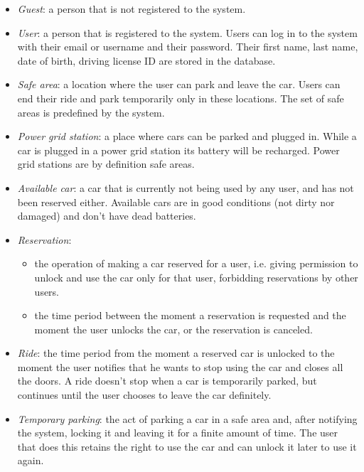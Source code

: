 \documentclass[english]{article}
\begin{document}
\begin{itemize}
\item{\textit{Guest}: a person that is not registered to the system.}
\item{\textit{User}: a person that is registered to the system. Users can log in to the system with their email or username and their password. Their first name, last name, date of birth, driving license ID are stored in the database.}
\item{\textit{Safe area}: a location where the user can park and leave the car. Users can end their ride and park temporarily only in these locations. The set of safe areas is predefined by the system.}
\item{\textit{Power grid station}: a place where cars can be parked and plugged in. While a car is plugged in a power grid station its battery will be recharged. Power grid stations are by definition safe areas.}
\item{\textit{Available car}: a car that is currently not being used by any user, and has not been reserved either. Available cars are in good conditions (not dirty nor damaged) and don’t have dead batteries.}
\item{\textit{Reservation}:
	\begin{itemize}
		\item{the operation of making a car reserved for a user, i.e. giving permission to unlock and use the car only for that user, forbidding reservations by other users.}
		\item{the time period between the moment a reservation is requested and the moment the user unlocks the car, or the reservation is canceled.}
	\end{itemize}
}
\item{\textit{Ride}: the time period from the moment a reserved car is unlocked to the moment the user notifies that he wants to stop using the car and closes all the doors. A ride doesn’t stop when a car is temporarily parked, but continues until the user chooses to leave the car definitely.}
\item{\textit{Temporary parking}: the act of parking a car in a safe area and, after notifying the system, locking it and leaving it for a finite amount of time. The user that does this retains the right to use the car and can unlock it later to use it again.}

\end{itemize}
\end{document}
